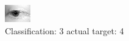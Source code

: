\begin{figure}[h!]
\begin{center}
\includegraphics[width=0.60\columnwidth]{figures/ID2568_class_3_target_4.png}
\end{center}
\caption{ Classification: 3 actual target: 4}
\label{fig:ID2568_class_3_target_4}
\end{figure}
